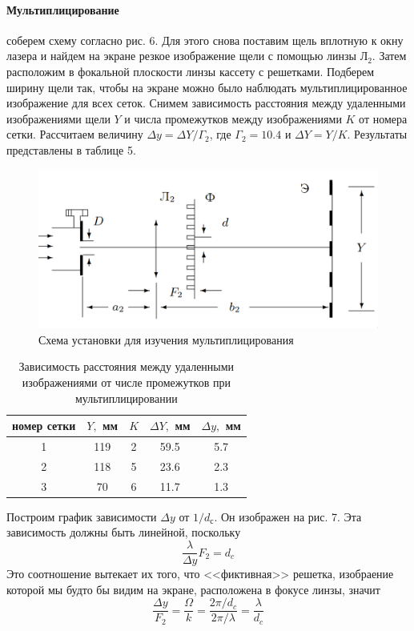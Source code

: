 \documentclass[a4paper,12pt]{article}
\begin{document}
\paragraph{Мультиплицирование} соберем схему согласно рис. 6. Для этого снова поставим щель вплотную к окну лазера и найдем на экране резкое изображение щели с помощью линзы Л$_2$. Затем расположим в фокальной плоскости линзы кассету с решетками. Подберем ширину щели так, чтобы на экране можно было наблюдать мультиплицированное изображение для всех сеток. Снимем зависимость расстояния между удаленными изображениями щели $Y$ и числа промежутков между изображениями $K$ от номера сетки. Рассчитаем величину $\Delta y = \Delta Y / \Gamma_2$, где $\Gamma_2 = 10.4$ и $\Delta Y = Y / K$. Результаты представлены в таблице 5.

\begin{figure}[H]
    \centering
    \includegraphics[scale=0.3]{image_4_.png}
    \caption{Схема установки для изучения мультиплицирования}
\end{figure}

\begin{table}[H]
    \centering
    \caption{Зависимость расстояния между удаленными изображениями от числе промежутков при мультиплицировании}
    \begin{tabular}{|c|c|c|c|c|} \hline
        номер сетки & $Y,$ мм & $K$ & $\Delta Y,$ мм & $\Delta y,$ мм \\ \hline
        1 & 119 & 2 & 59.5 & 5.7 \\ \hline
        2 & 118 & 5 & 23.6 & 2.3 \\ \hline
        3 & 70 & 6 & 11.7 & 1.3 \\ \hline
    \end{tabular}
\end{table}

\noindent Построим график зависимости $\Delta y$ от $1/d_\text{с}$. Он изображен на рис. 7. Эта зависимость должны быть линейной, поскольку 
\begin{equation}
    \frac{\lambda}{\Delta y} F_2 = d_c
\end{equation}
Это соотношение вытекает их того, что <<фиктивная>> решетка, изобраение которой мы будто бы видим на экране, расположена в фокусе линзы, значит 
\[
    \frac{\Delta y}{F_2} = \frac{\Omega}{k} = \frac{2\pi / d_c}{2\pi / \lambda} = \frac{\lambda}{d_c}
\]
\end{document}
